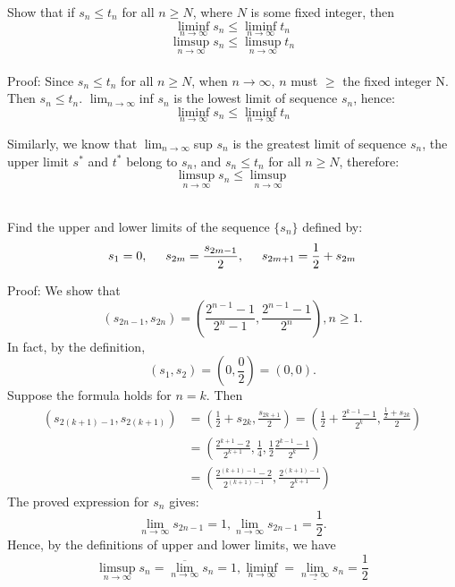 \documentclass [12pt,letterpaper]{exam}
\def\be{\begin{equation}}
\def\ee{\end{equation}}
\begin{document}
\begin{questions}

\question Show that if $s_n \leq t_n$ for all $n \geq N$, where $N$
is some fixed integer, then \be \liminf_{n \rightarrow \infty} s_n
\leq \liminf_{n \rightarrow \infty} t_n \nonumber \ee \be \limsup_{n
\rightarrow \infty} s_n \leq \limsup_{n \rightarrow \infty} t_n
\nonumber \ee\\
Proof: Since $s_n \leq t_n$ for all $n \geq N$, when $n \rightarrow \infty$, $n$ must $\geq $ the fixed integer N. Then $s_n \leq t_n$. $\lim_{n\to\infty}$inf $s_n$ is the lowest limit of sequence $s_n$, hence:$$\liminf_{n \rightarrow \infty} s_n \leq \liminf_{n \rightarrow \infty}t_n$$
\par \setlength
\indent Similarly, we know that $\lim_{n\to\infty}$sup $s_n$ is the greatest limit of sequence $s_n$, the upper limit $s^*$ and $t^*$ belong to $s_n$, and $s_n \leq t_n$ for all $n \geq N$, therefore:$$\limsup_{n \rightarrow \infty} s_n \leq \limsup_{n \rightarrow \infty}$$\\
\setlength{\parindent}{1cm}

\question Find the upper and lower limits of the sequence $\{ s_n
\}$ defined by: \be s_1 =0,\hspace{5mm}
s_{2m}=\frac{s_{2m-1}}{2},\hspace{5mm} s_{2m+1}=\frac{1}{2}+s_{2m}
\nonumber \ee

Proof: We show that $$(s_{2n-1}, s_{2n}) = (\frac{2^{n-1} - 1}{2^n-1},\frac{2^{n-1}-1}{2^n}), n \geq 1.$$
In fact, by the definition, $$(s_1,s_2)=(0,\frac{0}{2})=(0,0).$$
Suppose the formula holds for $n = k$. Then
\begin{equation} 
\begin{split}
(s_{2(k+1)-1},s_{2(k+1)}) & = (\frac{1}{2}+s_{2k},\frac{s_{2k+1}}{2}) = (\frac{1}{2}+\frac{2^{k-1}-1}{2^k},\frac{\frac{1}{2}+s_{2k}}{2})\\
 & = (\frac{2^{k+1}-2}{2^{k+1}},\frac{1}{4},\frac{1}{2}\frac{2^{k-1}-1}{2^k})\\
 & = (\frac{2^{(k+1)-1}-2}{2^{(k+1)-1}},\frac{2^{(k+1)-1}}{2^{k+1}})
\end{split}
\end{equation}
The proved expression for ${s_n}$ gives:
$$\lim_{n \rightarrow \infty}s_{2n-1} = 1, \lim_{n \rightarrow \infty}s_{2n-1} = \frac{1}{2}.$$
Hence, by the definitions of upper and lower limits, we have
$$\limsup_{n \rightarrow \infty}s_n = \overline{{\lim_{n \rightarrow \infty}}}s_n = 1, \liminf_{n \rightarrow \infty} = \underline{{\lim_{n \rightarrow \infty}}}s_n = \frac{1}{2}$$\\


\end{questions}
\end{document}
